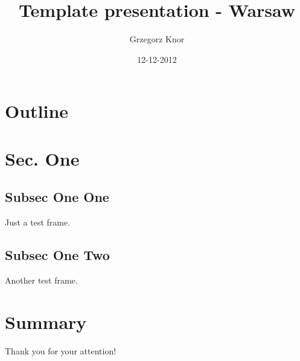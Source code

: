 \documentclass{beamer}
\title{Template presentation - Warsaw}
\author{Grzegorz Knor}
\date{12-12-2012}
\begin{document}
\begin{frame}
\titlepage
\end{frame}
\section*{Outline}
\begin{frame}
\tableofcontents
\end{frame}
\section{Sec. One}
\subsection{Subsec One One}
\begin{frame}
Just a test frame.
\end{frame}
\subsection{Subsec One Two}
\begin{frame}
Another test frame.
\end{frame}
\section{Summary}
\begin{frame}
Thank you for your attention!
\end{frame}
\end{document}
